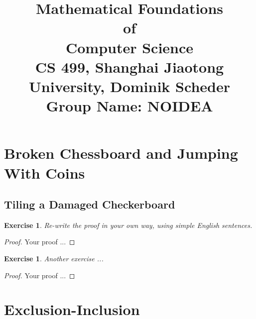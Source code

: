 \documentclass[12pt,a4]{article}
\date{}
\title{
	Mathematical Foundations \\of \\Computer Science\\
	\vspace{3mm}
	{\normalsize CS 499,	Shanghai Jiaotong University,  Dominik Scheder\\}
	{\normalsize Group Name: \textbf{NOIDEA}}
}
\newtheorem{exercise}[theorem]{Exercise}
\begin{document}
	
	\maketitle
%
%



\section{Broken Chessboard and Jumping With Coins}

\subsection{Tiling a Damaged Checkerboard}

\begin{exercise}
  Re-write the proof in your own way,  using simple English sentences.
\end{exercise}

\begin{proof}
	Your proof ...
\end{proof}

\begin{exercise}
	Another exercise ...
\end{exercise}

\begin{proof}
	Your proof ...
\end{proof}

\section{Exclusion-Inclusion}
\end{document}
